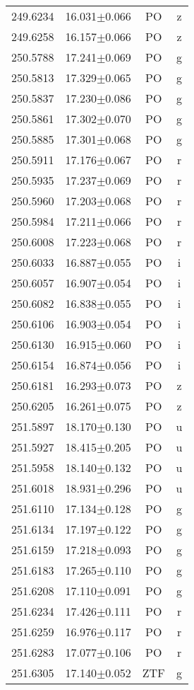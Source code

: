 \begin{table}
\begin{tabular}{cccc}
249.6234 & 16.031$\pm$0.066 & PO & z \\
249.6258 & 16.157$\pm$0.066 & PO & z \\
250.5788 & 17.241$\pm$0.069 & PO & g \\
250.5813 & 17.329$\pm$0.065 & PO & g \\
250.5837 & 17.230$\pm$0.086 & PO & g \\
250.5861 & 17.302$\pm$0.070 & PO & g \\
250.5885 & 17.301$\pm$0.068 & PO & g \\
250.5911 & 17.176$\pm$0.067 & PO & r \\
250.5935 & 17.237$\pm$0.069 & PO & r \\
250.5960 & 17.203$\pm$0.068 & PO & r \\
250.5984 & 17.211$\pm$0.066 & PO & r \\
250.6008 & 17.223$\pm$0.068 & PO & r \\
250.6033 & 16.887$\pm$0.055 & PO & i \\
250.6057 & 16.907$\pm$0.054 & PO & i \\
250.6082 & 16.838$\pm$0.055 & PO & i \\
250.6106 & 16.903$\pm$0.054 & PO & i \\
250.6130 & 16.915$\pm$0.060 & PO & i \\
250.6154 & 16.874$\pm$0.056 & PO & i \\
250.6181 & 16.293$\pm$0.073 & PO & z \\
250.6205 & 16.261$\pm$0.075 & PO & z \\
251.5897 & 18.170$\pm$0.130 & PO & u \\
251.5927 & 18.415$\pm$0.205 & PO & u \\
251.5958 & 18.140$\pm$0.132 & PO & u \\
251.6018 & 18.931$\pm$0.296 & PO & u \\
251.6110 & 17.134$\pm$0.128 & PO & g \\
251.6134 & 17.197$\pm$0.122 & PO & g \\
251.6159 & 17.218$\pm$0.093 & PO & g \\
251.6183 & 17.265$\pm$0.110 & PO & g \\
251.6208 & 17.110$\pm$0.091 & PO & g \\
251.6234 & 17.426$\pm$0.111 & PO & r \\
251.6259 & 16.976$\pm$0.117 & PO & r \\
251.6283 & 17.077$\pm$0.106 & PO & r \\
251.6305 & 17.140$\pm$0.052 & ZTF & g \\

\end{tabular}
\end{table}
